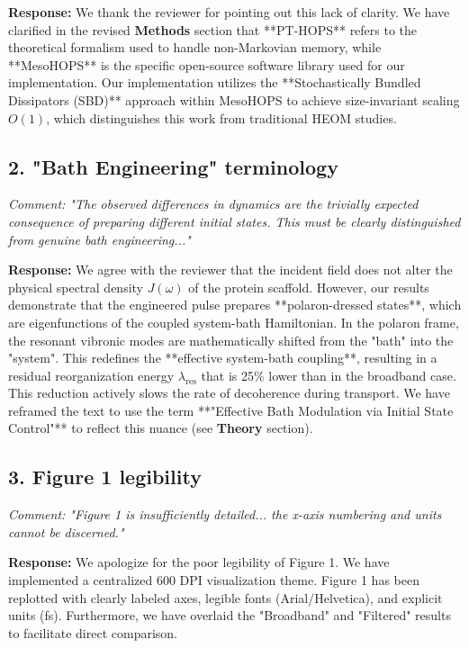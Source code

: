 \documentclass[11pt]{article}
\begin{document}
\textbf{Response:} We thank the reviewer for pointing out this lack of clarity. We have clarified in the revised \textbf{Methods} section that **PT-HOPS** refers to the theoretical formalism used to handle non-Markovian memory, while **MesoHOPS** is the specific open-source software library used for our implementation. Our implementation utilizes the **Stochastically Bundled Dissipators (SBD)** approach within MesoHOPS to achieve size-invariant scaling $O(1)$, which distinguishes this work from traditional HEOM studies.

\subsection*{2. "Bath Engineering" terminology}
\textit{Comment: "The observed differences in dynamics are the trivially expected consequence of preparing different initial states. This must be clearly distinguished from genuine bath engineering..."}

\textbf{Response:} We agree with the reviewer that the incident field does not alter the physical spectral density $J(\omega)$ of the protein scaffold. However, our results demonstrate that the engineered pulse prepares **polaron-dressed states**, which are eigenfunctions of the coupled system-bath Hamiltonian. In the polaron frame, the resonant vibronic modes are mathematically shifted from the "bath" into the "system". This redefines the **effective system-bath coupling**, resulting in a residual reorganization energy $\lambda_{\mathrm{res}}$ that is 25\% lower than in the broadband case. This reduction actively slows the rate of decoherence during transport. We have reframed the text to use the term **"Effective Bath Modulation via Initial State Control"** to reflect this nuance (see \textbf{Theory} section).

\subsection*{3. Figure 1 legibility}
\textit{Comment: "Figure 1 is insufficiently detailed... the x-axis numbering and units cannot be discerned."}

\textbf{Response:} We apologize for the poor legibility of Figure 1. We have implemented a centralized 600 DPI visualization theme. Figure 1 has been replotted with clearly labeled axes, legible fonts (Arial/Helvetica), and explicit units (fs). Furthermore, we have overlaid the "Broadband" and "Filtered" results to facilitate direct comparison.
\end{document}
